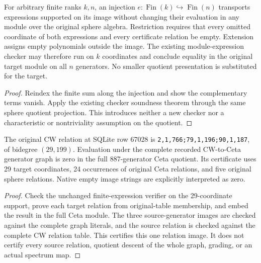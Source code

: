 \begin{proposition}
  \label{prop:lin-native-module-support-compression}
  \leanok
  For arbitrary finite ranks $k,n$, an injection
  $e:\operatorname{Fin}(k)\hookrightarrow\operatorname{Fin}(n)$ transports
  expressions supported on its image without changing their evaluation in
  any module over the original sphere algebra. Restriction requires that
  every omitted coordinate of both expressions and every certificate
  relation be empty. Extension assigns empty polynomials outside the image.
  The existing module-expression checker may therefore run on $k$ coordinates
  and conclude equality in the original target module on all $n$ generators.
  No smaller quotient presentation is substituted for the target.
\end{proposition}
\begin{proof}
  \leanok
  Reindex the finite sum along the injection and show the complementary
  terms vanish. Apply the existing checker soundness theorem through the
  same sphere quotient projection. This introduces neither a new checker
  nor a characteristic or nontriviality assumption on the quotient.
\end{proof}

\begin{lemma}
  \label{lem:lin-cw-map-maximal-support-relation}
  \leanok
  The original CW relation at SQLite row 67028 is
  \texttt{2,1,766;79,1,196;90,1,187}, of bidegree $(29,199)$.
  Evaluation under the complete recorded CW-to-Ceta generator graph
  is zero in the full 887-generator Ceta quotient. Its certificate uses
  29 target coordinates, 24 occurrences of original Ceta relations, and
  five original sphere relations.
  Native empty image strings are explicitly interpreted as zero.
\end{lemma}
\begin{proof}
  \leanok
  Check the unchanged finite-expression verifier on the 29-coordinate
  support, prove each target relation from original-table membership,
  and embed the result in the full Ceta module. The three source-generator
  images are checked against the complete graph literals, and the source
  relation is checked against the complete CW relation table. This certifies
  this one relation image. It does not certify every source relation,
  quotient descent of the whole graph, grading, or an actual spectrum map.
\end{proof}

